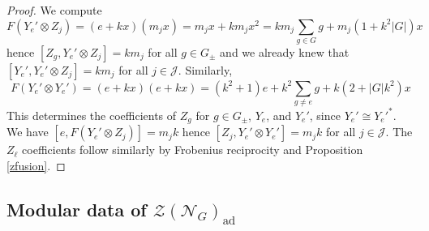 \documentclass[10pt]{article}
\theoremstyle{plain}
\theoremstyle{definition}
\theoremstyle{plain}
\begin{document}
\begin{proof}
    We compute
\begin{equation}\label{yeprime}
    F(Y_e'\otimes Z_j)=(e+kx)(m_jx)=m_jx+km_jx^2=km_j\sum_{g\in G}g+m_j(1+k^2|G|)x
\end{equation}
hence $[Z_g,Y_e'\otimes Z_j]=km_j$ for all $g\in G_{\pm}$ and we already knew that $[Y_e',Y_e'\otimes Z_j]=km_j$ for all $j\in\mathcal{J}$.  Similarly,
\begin{equation}
    F(Y_e'\otimes Y_e')=(e+kx)(e+kx)=(k^2+1)e+k^2\sum_{g\neq e}g+k(2+|G|k^2)x
\end{equation}
This determines the coefficients of $Z_g$ for $g\in G_{\pm}$, $Y_e$, and $Y_e'$, since $Y_e'\cong {Y_e'}^\ast$.  We have $[e,F(Y_e'\otimes Z_j)]=m_jk$ hence $[Z_j,Y_e'\otimes Y_e']=m_jk$ for all $j\in\mathcal{J}$. The $Z_\ell$ coefficients follow similarly by Frobenius reciprocity and Proposition \ref{zfusion}.
\end{proof}


\subsection{Modular data of \texorpdfstring{$\mathcal{Z}(\mathcal{N}_G)_\mathrm{ad}$}{Z(N\_G)-ad}}\label{subsec:modulardata}
\end{document}
